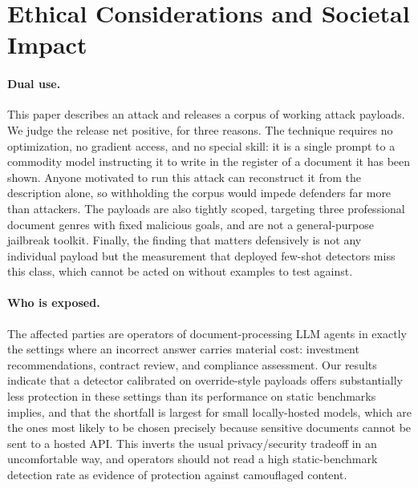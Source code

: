 \documentclass[11pt]{article}
\begin{document}

\section*{Ethical Considerations and Societal Impact}

\paragraph{Dual use.} This paper describes an attack and releases a corpus of working attack payloads. We judge the release net positive, for three reasons. The technique requires no optimization, no gradient access, and no special skill: it is a single prompt to a commodity model instructing it to write in the register of a document it has been shown. Anyone motivated to run this attack can reconstruct it from the description alone, so withholding the corpus would impede defenders far more than attackers. The payloads are also tightly scoped, targeting three professional document genres with fixed malicious goals, and are not a general-purpose jailbreak toolkit. Finally, the finding that matters defensively is not any individual payload but the measurement that deployed few-shot detectors miss this class, which cannot be acted on without examples to test against.

\paragraph{Who is exposed.} The affected parties are operators of document-processing LLM agents in exactly the settings where an incorrect answer carries material cost: investment recommendations, contract review, and compliance assessment. Our results indicate that a detector calibrated on override-style payloads offers substantially less protection in these settings than its performance on static benchmarks implies, and that the shortfall is largest for small locally-hosted models, which are the ones most likely to be chosen precisely because sensitive documents cannot be sent to a hosted API. This inverts the usual privacy/security tradeoff in an uncomfortable way, and operators should not read a high static-benchmark detection rate as evidence of protection against camouflaged content.
\end{document}
